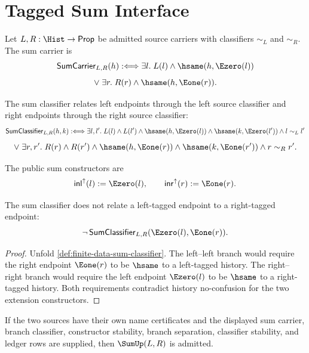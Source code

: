 \section{Tagged Sum Interface}
\label{sec:finite-data-sum-interface}

\begin{definition}
\label{def:finite-data-sum-carrier}
Let $L,R:\Hist\to\mathsf{Prop}$ be admitted source carriers with classifiers
$\sim_L$ and $\sim_R$.  The sum carrier is
$$
\mathsf{SumCarrier}_{L,R}(h)
:\Longleftrightarrow
\exists l.\;L(l)\wedge\hsame(h,\Ezero(l))
$$
$$
\vee\;
\exists r.\;R(r)\wedge\hsame(h,\Eone(r)).
$$
\end{definition}

\begin{definition}
\label{def:finite-data-sum-classifier}
The sum classifier relates left endpoints through the left source
classifier and right endpoints through the right source classifier:
$$
\mathsf{SumClassifier}_{L,R}(h,k)
:\Longleftrightarrow
\exists l,l'.\;
L(l)\wedge L(l')\wedge
\hsame(h,\Ezero(l))\wedge
\hsame(k,\Ezero(l'))\wedge
l\sim_L l'
$$
$$
\vee\;
\exists r,r'.\;
R(r)\wedge R(r')\wedge
\hsame(h,\Eone(r))\wedge
\hsame(k,\Eone(r'))\wedge
r\sim_R r'.
$$
\end{definition}

\begin{definition}
\label{def:finite-data-sum-constructors}
The public sum constructors are
$$
\mathsf{inl}^{\uparrow}(l):=\Ezero(l),
\qquad
\mathsf{inr}^{\uparrow}(r):=\Eone(r).
$$
\end{definition}

\begin{theorem}
\label{thm:finite-data-sum-branch-separation}
The sum classifier does not relate a left-tagged endpoint to a right-tagged
endpoint:
$$
\neg\,\mathsf{SumClassifier}_{L,R}(\Ezero(l),\Eone(r)).
$$
\end{theorem}

\begin{proof}
Unfold \autoref{def:finite-data-sum-classifier}.  The left--left branch
would require the right endpoint $\Eone(r)$ to be $\hsame$ to a left-tagged
history.  The right--right branch would require the left endpoint
$\Ezero(l)$ to be $\hsame$ to a right-tagged history.  Both requirements
contradict history no-confusion for the two extension constructors.
\end{proof}

\begin{corollary}
\label{cor:finite-data-sum-admission}
If the two sources have their own name certificates and the displayed sum
carrier, branch classifier, constructor stability, branch separation,
classifier stability, and ledger rows are supplied, then
$\SumUp(L,R)$ is admitted.
\end{corollary}

